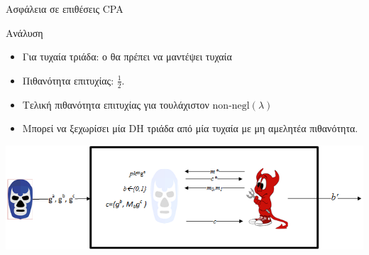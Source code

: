 \documentclass[handout]{beamer}
\begin{document}
\begin{frame}[allowframebreaks]{Ασφάλεια σε επιθέσεις CPA}
\begin{block}{Ανάλυση}
\begin{itemize}
\item Για τυχαία τριάδα: ο \adv θα πρέπει να μαντέψει τυχαία
\item Πιθανότητα επιτυχίας: $\frac{1}{2}$.

\item Τελική πιθανότητα επιτυχίας για \advb τουλάχιστον $\text{non-negl}(\lambda)$
\item Μπορεί να ξεχωρίσει μία DH τριάδα από μία τυχαία με μη αμελητέα πιθανότητα.

\end{itemize}
\end{block}

\begin{center}
\includegraphics[scale=.6]{egcpa.png}
\end{center}

\end{frame}
\end{document}
